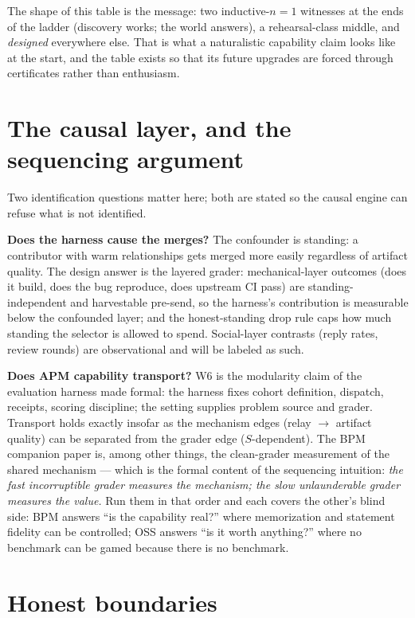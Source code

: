 \documentclass[11pt]{article}
\newcommand{\warrant}[1]{\textsl{#1}}
\begin{document}
\medskip
The shape of this table is the message: two inductive-$n{=}1$
witnesses at the ends of the ladder (discovery works; the world
answers), a rehearsal-class middle, and \warrant{designed}
everywhere else. That is what a naturalistic capability claim looks
like at the start, and the table exists so that its future upgrades
are forced through certificates rather than enthusiasm.

\section{The causal layer, and the sequencing argument}
\label{sec:seq}

Two identification questions matter here; both are stated so the
causal engine can refuse what is not identified.

\textbf{Does the harness cause the merges?} The confounder is
standing: a contributor with warm relationships gets merged more
easily regardless of artifact quality. The design answer is the
layered grader: mechanical-layer outcomes (does it build, does the
bug reproduce, does upstream CI pass) are standing-independent and
harvestable pre-send, so the harness's contribution is measurable
below the confounded layer; and the honest-standing drop rule caps
how much standing the selector is allowed to spend. Social-layer
contrasts (reply rates, review rounds) are observational and will be
labeled as such.

\textbf{Does APM capability transport?} W6 is the modularity claim
of the evaluation harness made formal: the harness fixes cohort
definition, dispatch, receipts, scoring discipline; the setting
supplies problem source and grader. Transport holds exactly insofar
as the mechanism edges (relay $\to$ artifact quality) can be
separated from the grader edge ($S$-dependent). The BPM companion
paper is, among other things, the clean-grader measurement of the
shared mechanism --- which is the formal content of the sequencing
intuition: \emph{the fast incorruptible grader measures the
mechanism; the slow unlaunderable grader measures the value.} Run
them in that order and each covers the other's blind side: BPM
answers ``is the capability real?'' where memorization and statement
fidelity can be controlled; OSS answers ``is it worth anything?''
where no benchmark can be gamed because there is no benchmark.

\section{Honest boundaries}
\end{document}
